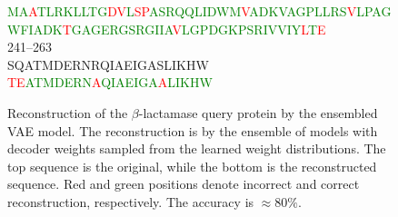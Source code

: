 \begin{figure}[H]
{\textcolor{green}{M}\textcolor{green}{A}\textcolor{red}{A}\textcolor{green}{T}\textcolor{green}{L}\textcolor{green}{R}\textcolor{green}{K}\textcolor{green}{L}\textcolor{green}{L}\textcolor{green}{T}\textcolor{green}{G}\textcolor{red}{D}\textcolor{red}{V}\textcolor{green}{L}\textcolor{red}{S}\textcolor{red}{P}\textcolor{green}{A}\textcolor{green}{S}\textcolor{green}{R}\textcolor{green}{Q}\textcolor{green}{Q}\textcolor{green}{L}\textcolor{green}{I}\textcolor{green}{D}\textcolor{green}{W}\textcolor{green}{M}\textcolor{red}{V}\textcolor{green}{A}\textcolor{green}{D}\textcolor{green}{K}\textcolor{green}{V}\textcolor{green}{A}\textcolor{green}{G}\textcolor{green}{P}\textcolor{green}{L}\textcolor{green}{L}\textcolor{green}{R}\textcolor{green}{S}\textcolor{red}{V}\textcolor{green}{L}\textcolor{green}{P}\textcolor{green}{A}\textcolor{green}{G}\textcolor{green}{W}\textcolor{green}{F}\textcolor{green}{I}\textcolor{green}{A}\textcolor{green}{D}\textcolor{green}{K}\textcolor{red}{T}\textcolor{green}{G}\textcolor{green}{A}\textcolor{green}{G}\textcolor{green}{E}\textcolor{green}{R}\textcolor{green}{G}\textcolor{green}{S}\textcolor{green}{R}\textcolor{green}{G}\textcolor{green}{I}\textcolor{green}{I}\textcolor{green}{A}\textcolor{red}{V}\textcolor{green}{L}\textcolor{green}{G}\textcolor{green}{P}\textcolor{green}{D}\textcolor{green}{G}\textcolor{green}{K}\textcolor{green}{P}\textcolor{green}{S}\textcolor{green}{R}\textcolor{green}{I}\textcolor{green}{V}\textcolor{green}{V}\textcolor{green}{I}\textcolor{green}{Y}\textcolor{red}{L}\textcolor{green}{T}\textcolor{red}{E} \\
241--263 \\
SQATMDERNRQIAEIGASLIKHW \\
\textcolor{red}{T}\textcolor{red}{E}\textcolor{green}{A}\textcolor{green}{T}\textcolor{green}{M}\textcolor{green}{D}\textcolor{green}{E}\textcolor{green}{R}\textcolor{green}{N}\textcolor{red}{A}\textcolor{green}{Q}\textcolor{green}{I}\textcolor{green}{A}\textcolor{green}{E}\textcolor{green}{I}\textcolor{green}{G}\textcolor{green}{A}\textcolor{red}{A}\textcolor{green}{L}\textcolor{green}{I}\textcolor{green}{K}\textcolor{green}{H}\textcolor{green}{W}}
    \caption{Reconstruction of the $\beta$-lactamase query protein by the ensembled VAE model. The reconstruction is by the ensemble of models with decoder weights sampled from the learned weight distributions. The top sequence is the original, while the bottom is the reconstructed sequence. Red and green positions denote incorrect and correct reconstruction, respectively. The accuracy is $\approx 80\%$.}
    \label{fig:protein_reconstruction}
\end{figure}
